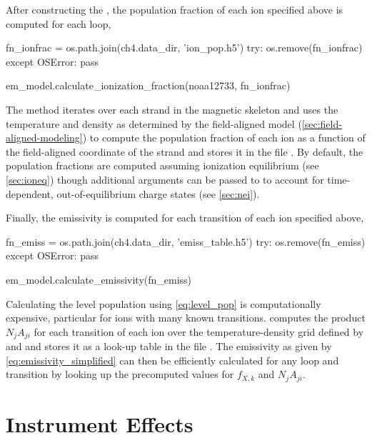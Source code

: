 After constructing the , the population fraction of each ion specified above is computed for each loop,
\begin{pycode}[chapter4]
fn_ionfrac = os.path.join(ch4.data_dir, 'ion_pop.h5')
try:
    os.remove(fn_ionfrac)
except OSError:
    pass
\end{pycode}
\begin{pyblock}[chapter4][baselinestretch=1,xleftmargin=3em]
em_model.calculate_ionization_fraction(noaa12733, fn_ionfrac)
\end{pyblock}
The  method iterates over each strand in the magnetic skeleton and uses the temperature and density as determined by the field-aligned model (\autoref{sec:field-aligned-modeling}) to compute the population fraction of each ion as a function of the field-aligned coordinate of the strand and stores it in the file . By default, the population fractions are computed assuming ionization equilibrium (see \autoref{sec:ioneq}) though additional arguments can be passed to  to account for time-dependent, out-of-equilibrium charge states (see \autoref{sec:nei}).

Finally, the emissivity is computed for each transition of each ion specified above,
\begin{pycode}[chapter4]
fn_emiss = os.path.join(ch4.data_dir, 'emiss_table.h5')
try:
    os.remove(fn_emiss)
except OSError:
    pass
\end{pycode}
\begin{pyblock}[chapter4][baselinestretch=1,xleftmargin=3em]
em_model.calculate_emissivity(fn_emiss)
\end{pyblock}
Calculating the level population using \autoref{eq:level_pop} is computationally expensive, particular for ions with many known transitions.  computes the product $N_jA_{ji}$ for each transition of each ion over the temperature-density grid defined by  and  and stores it as a look-up table in the file . The emissivity as given by \autoref{eq:emissivity_simplified} can then be efficiently calculated for any loop and transition by looking up the precomputed values for $f_{X,k}$ and $N_jA_{ji}$.

\section{Instrument Effects}\label{sec:instrument-effects}

